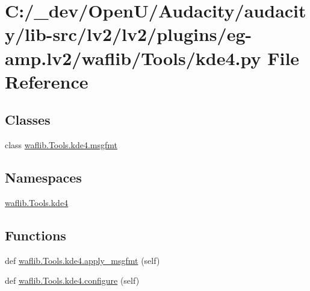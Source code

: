 \hypertarget{lv2_2plugins_2eg-amp_8lv2_2waflib_2_tools_2kde4_8py}{}\section{C\+:/\+\_\+dev/\+Open\+U/\+Audacity/audacity/lib-\/src/lv2/lv2/plugins/eg-\/amp.lv2/waflib/\+Tools/kde4.py File Reference}
\label{lv2_2plugins_2eg-amp_8lv2_2waflib_2_tools_2kde4_8py}
\subsection*{Classes}
\begin{DoxyCompactItemize}
\item 
class \hyperlink{classwaflib_1_1_tools_1_1kde4_1_1msgfmt}{waflib.\+Tools.\+kde4.\+msgfmt}
\end{DoxyCompactItemize}
\subsection*{Namespaces}
\begin{DoxyCompactItemize}
\item 
 \hyperlink{namespacewaflib_1_1_tools_1_1kde4}{waflib.\+Tools.\+kde4}
\end{DoxyCompactItemize}
\subsection*{Functions}
\begin{DoxyCompactItemize}
\item 
def \hyperlink{namespacewaflib_1_1_tools_1_1kde4_a62b36b23c1da96a111189ea65c2c6baa}{waflib.\+Tools.\+kde4.\+apply\+\_\+msgfmt} (self)
\item 
def \hyperlink{namespacewaflib_1_1_tools_1_1kde4_a6ffba63774560559cef87345d1613418}{waflib.\+Tools.\+kde4.\+configure} (self)
\end{DoxyCompactItemize}
